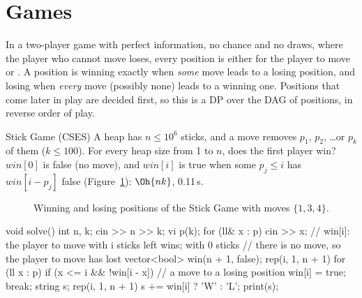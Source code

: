 \section[Games]{Games \hfill \gold}\label{sec:gamedp}

In a two-player game with perfect information, no chance and no draws, where the player who cannot move loses, every position is
either  for the player to move or . A position is winning exactly when \emph{some} move leads to a losing
position, and losing when \emph{every} move (possibly none) leads to a winning one. Positions that come later in play are decided
first, so this is a DP over the DAG of positions, in reverse order of play.

\begin{problem}{Stick Game (CSES)}
A heap has $n \le 10^6$ sticks, and a move removes $p_1$, $p_2$, \dots or $p_k$ of them ($k \le 100$). For every heap size from 1 to $n$,
does the first player win?
\solution $\mathit{win}[0]$ is false (no move), and $\mathit{win}[i]$ is true when some $p_j \le i$ has $\mathit{win}[i - p_j]$ false
(Figure~\ref{fig:stickgame}): $\Oh{nk}$, 0.11\,s.
\end{problem}

\begin{figure}[htbp]
\centering
{}
\caption{Winning and losing positions of the Stick Game with moves $\{1, 3, 4\}$.}
\label{fig:stickgame}
\end{figure}

\begin{code}
void solve() {
    int n, k;
    cin >> n >> k;
    vi p(k);
    for (ll& x : p) cin >> x;
    // win[i]: the player to move with i sticks left wins; with 0 sticks
    // there is no move, so the player to move has lost
    vector<bool> win(n + 1, false);
    rep(i, 1, n + 1) for (ll x : p)
        if (x <= i && !win[i - x]) {  // a move to a losing position
            win[i] = true;
            break;
        }
    string s;
    rep(i, 1, n + 1) s += win[i] ? 'W' : 'L';
    print(s);
}
\end{code}

